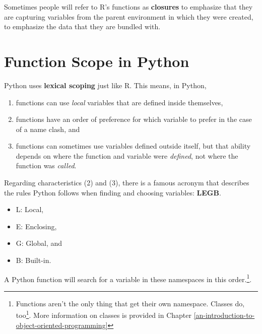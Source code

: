 \documentclass[12pt,krantz2]{krantz}
\providecommand{\tightlist}{%
  \setlength{\itemsep}{0pt}\setlength{\parskip}{0pt}}
\renewcommand{\href}[2]{#2\footnote{\url{#1}}}
\begin{document}
\begin{rmd-details}
Sometimes people will refer to R's functions as \textbf{closures} to emphasize that they are capturing variables from the parent environment in which they were created, to emphasize the data that they are bundled with.

\end{rmd-details}

\hypertarget{function-scope-in-python}{%
\section{Function Scope in Python}\label{function-scope-in-python}}

Python uses \textbf{lexical scoping} just like R. This means, in Python,

\begin{enumerate}
\def\labelenumi{\arabic{enumi}.}
\tightlist
\item
  functions can use \emph{local} variables that are defined inside themselves,\\
\item
  functions have an order of preference for which variable to prefer in the case of a name clash, and
\item
  functions can sometimes use variables defined outside itself, but that ability depends on where the function and variable were \emph{defined}, not where the function was \emph{called}.
\end{enumerate}

Regarding characteristics (2) and (3), there is a famous acronym that describes the rules Python follows when finding and choosing variables: \textbf{LEGB}.

\begin{itemize}
\tightlist
\item
  L: Local,
\item
  E: Enclosing,
\item
  G: Global, and
\item
  B: Built-in.
\end{itemize}

A Python function will search for a variable in these namespaces in this order.\footnote{Functions aren't the only thing that get their own namespace. \href{https://docs.python.org/3/tutorial/classes.html\#a-first-look-at-classes}{Classes do, too}. More information on classes is provided in Chapter \ref{an-introduction-to-object-oriented-programming}}.
\end{document}
